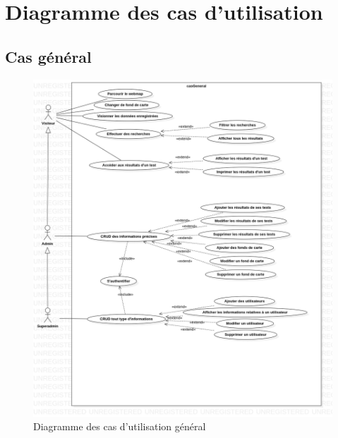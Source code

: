 \section{Diagramme des cas d'utilisation}
    \subsection{Cas général}
    \begin{figure}
        \centering
        \includegraphics[width=1\textwidth]{casGeneral.png}
        \caption{Diagramme des cas d'utilisation général}
    \end{figure}
    